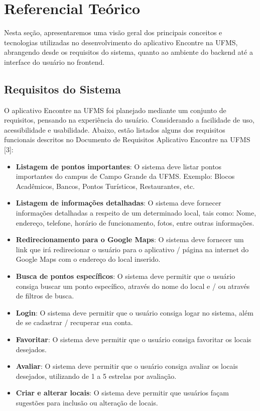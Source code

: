 \section{Referencial Teórico}

Nesta seção, apresentaremos uma visão geral dos principais conceitos e tecnologias utilizadas no desenvolvimento do aplicativo Encontre na UFMS, abrangendo desde os requisitos do sistema, quanto ao ambiente do backend até a interface do usuário no frontend.

\subsection{Requisitos do Sistema}

O aplicativo Encontre na UFMS foi planejado mediante um conjunto de requisitos, pensando na experiência do usuário. Considerando a facilidade de uso, acessibilidade e usabilidade. Abaixo, estão listados alguns dos requisitos funcionais descritos no Documento de Requisitos Aplicativo Encontre na UFMS [3]:

\begin{itemize}
  \item \textbf{Listagem de pontos importantes}: O sistema deve listar pontos importantes do campus de Campo Grande da UFMS. Exemplo: Blocos Acadêmicos, Bancos, Pontos Turísticos, Restaurantes, etc.
  \item \textbf{Listagem de informações detalhadas}: O sistema deve fornecer informações detalhadas a respeito de um determinado local, tais como: Nome, endereço, telefone, horário de funcionamento, fotos, entre outras informações.
  \item \textbf{Redirecionamento para o Google Maps}:  O sistema deve fornecer um link que irá redirecionar o usuário para o aplicativo / página na internet do Google Maps com o endereço do local inserido.
  \item \textbf{Busca de pontos específicos}: O sistema deve permitir que o usuário consiga buscar um ponto específico, através do nome do local e / ou através de filtros de busca.
  \item \textbf{Login}: O sistema deve permitir que o usuário consiga logar no sistema, além de se cadastrar / recuperar sua conta.
  \item \textbf{Favoritar}:  O sistema deve permitir que o usuário consiga favoritar os locais desejados.
  \item \textbf{Avaliar}:  O sistema deve permitir que o usuário consiga avaliar os locais desejados, utilizando de 1 a 5 estrelas por avaliação.
  \item \textbf{Criar e alterar locais}: O sistema deve permitir que usuários façam sugestões para inclusão ou alteração de locais.
\end{itemize}

